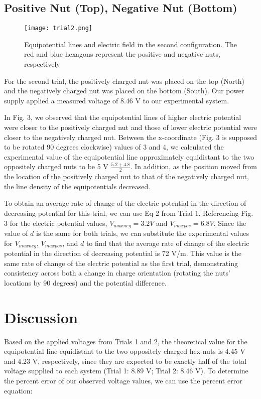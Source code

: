 \documentclass[conference]{IEEEtran}
\begin{document}
\subsection{Positive Nut (Top), Negative Nut (Bottom)}
\begin{figure}
\centerline{\texttt{[image: trial2.png]}} %
\caption{Equipotential lines and electric field in the second configuration. The red and blue hexagons represent the positive and negative nuts, respectively}
\end{figure}
For the second trial, the positively charged nut was placed on the top (North) and the negatively charged nut was placed on the bottom (South). Our power supply applied a measured voltage of 8.46 V to our experimental system.

In Fig. 3, we observed that the equipotential lines of higher electric potential were closer to the positively charged nut and those of lower electric potential were closer to the negatively charged nut. Between the x-coordinate (Fig. 3 is supposed to be rotated 90 degrees clockwise) values of 3 and 4, we calculated the experimental value of the equipotential line approximately equidistant to the two oppositely charged nuts to be 5 V $\frac{5.2+4.8}{2}$. In addition, as the position moved from the location of the positively charged nut to that of the negatively charged nut, the line density of the equipotentials decreased. 

To obtain an average rate of change of the electric potential in the direction of decreasing potential for this trial, we can use Eq 2 from Trial 1. Referencing Fig. 3 for the electric potential values, $V_{maxneg} = 3.2 V$ and $V_{maxpos} = 6.8 V$. Since the value of $d$ is the same for both trials, we can substitute the experimental values for $V_{maxneg}$, $V_{maxpos}$, and $d$ to find that the average rate of change of the electric potential in the direction of decreasing potential is 72 V/m. This value is the same rate of change of the electric potential as the first trial, demonstrating consistency across both a change in charge orientation (rotating the nuts’ locations by 90 degrees) and the potential difference.


\section{Discussion}
Based on the applied voltages from Trials 1 and 2, the theoretical value for the equipotential line equidistant to the two oppositely charged hex nuts is 4.45 V and 4.23 V, respectively, since they are expected to be exactly half of the total voltage supplied to each system (Trial 1: 8.89 V; Trial 2: 8.46 V). To determine the percent error of our observed voltage values, we can use the percent error equation:
\end{document}
